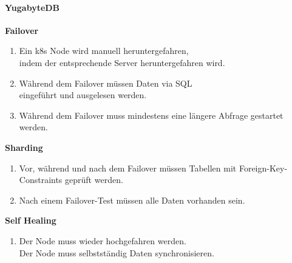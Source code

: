 \begin{flushleft}
    \paragraph{YugabyteDB}
    \begin{description}
        \item \textbf{Failover}\hfill \\
        \begin{enumerate}
            \item Ein k8s Node wird manuell heruntergefahren,\\indem der entsprechende Server heruntergefahren wird.
            \item Während dem Failover müssen Daten via SQL\\eingeführt und ausgelesen werden.
            \item Während dem Failover muss mindestens eine längere Abfrage gestartet werden.
        \end{enumerate}
        \item \textbf{Sharding}\hfill \\
        \begin{enumerate}[resume]
            \item Vor, während und nach dem Failover müssen Tabellen mit Foreign-Key-Constraints geprüft werden.
            \item Nach einem Failover-Test müssen alle Daten vorhanden sein.
        \end{enumerate}
        \item \textbf{Self Healing}\hfill \\
        \begin{enumerate}[resume]
            \item Der Node muss wieder hochgefahren werden.\\Der Node muss selbstständig Daten synchronisieren.
        \end{enumerate}
    \end{description}
\end{flushleft}
